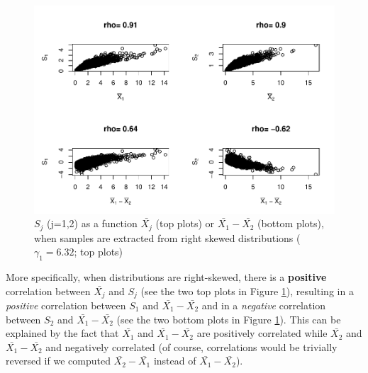 \documentclass[
  man]{apa6}
\begin{document}
\begin{figure}
\centering
\includegraphics{Correlations-between-the-sample-means-difference-and-standardizers-of-all-estimators,-and-implications-on-biases-and-variances-of-all-estimators_files/figure-latex/pltSDHombalRskew-1.pdf}
\caption{\label{fig:pltSDHombalRskew}\(S_j\) (j=1,2) as a function \(\bar{X_j}\) (top plots) or \(\bar{X_1}-\bar{X_2}\) (bottom plots), when samples are extracted from right skewed distributions (\(\gamma_1 = 6.32\); top plots)}
\end{figure}

More specifically, when distributions are right-skewed, there is a \textbf{positive} correlation between \(\bar{X_j}\) and \(S_j\) (see the two top plots in Figure \ref{fig:pltSDHombalRskew}), resulting in a \emph{positive} correlation between \(S_1\) and \(\bar{X_1}-\bar{X_2}\) and in a \emph{negative} correlation between \(S_2\) and \(\bar{X_1}-\bar{X_2}\) (see the two bottom plots in Figure \ref{fig:pltSDHombalRskew}). This can be explained by the fact that \(\bar{X_1}\) and \(\bar{X_1}-\bar{X_2}\) are positively correlated while \(\bar{X_2}\) and \(\bar{X_1}-\bar{X_2}\) and negatively correlated (of course, correlations would be trivially reversed if we computed \(\bar{X_2}-\bar{X_1}\) instead of \(\bar{X_1}-\bar{X_2}\)).
\end{document}
